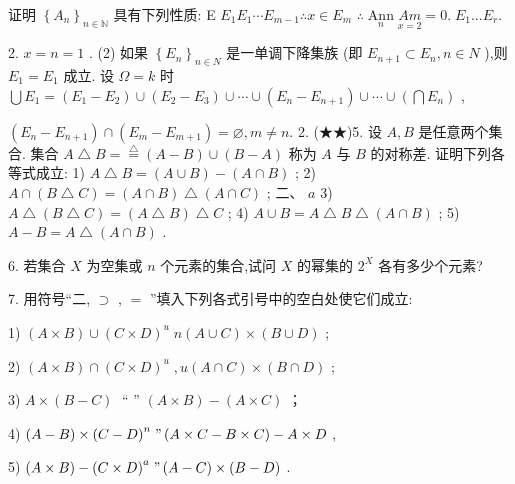 证明 ${\left\{  {A}_{n}\right\}  }_{n \in  \mathbb{N}}$ 具有下列性质: E ${E}_{1}{E}_{1}\cdots {E}_{m - 1}\therefore x \in  {E}_{m}$  $\therefore \mathop{\operatorname{Ann}}\limits_{n}\underset{x = 2}{Am} = 0.\;{E}_{1}...{E}_{r}.$

2. $x = n = 1$ . (2) 如果 ${\left\{  {E}_{n}\right\}  }_{n \in  N}$ 是一单调下降集族 (即 ${E}_{n + 1} \subset  {E}_{n},n \in  N$ ),则 ${E}_{1} = {E}_{1}$ 成立. 设 $\Omega  = k$ 时 $\bigcup {E}_{1} = \left( {{E}_{1} - {E}_{2}}\right)  \cup  \left( {{E}_{2} - {E}_{3}}\right)  \cup  \cdots  \cup  \left( {{E}_{n} - {E}_{n + 1}}\right)  \cup  \cdots  \cup  \left( {\bigcap {E}_{n}}\right)$ ,

$\left( {{E}_{n} - {E}_{n + 1}}\right)  \cap  \left( {{E}_{m} - {E}_{m + 1}}\right)  = \varnothing ,m \neq  n.$ 2. (★★)5. 设 $A,B$ 是任意两个集合. 集合 $A \bigtriangleup  B = \overset{ \bigtriangleup  }{ = }\left( {A - B}\right)  \cup  \left( {B - A}\right)$ 称为 $A$ 与 $B$ 的对称差. 证明下列各等式成立: 1) $A \bigtriangleup  B = \left( {A \cup  B}\right)  - \left( {A \cap  B}\right)$ ; 2) $A \cap  \left( {B\bigtriangleup C}\right)  = \left( {A \cap  B}\right) \bigtriangleup \left( {A \cap  C}\right)$ ; 二、 $a$ 3) $A \bigtriangleup  \left( {B \bigtriangleup  C}\right)  = \left( {A \bigtriangleup  B}\right)  \bigtriangleup  C$ ; 4) $A \cup  B = A \bigtriangleup  B \bigtriangleup  \left( {A \cap  B}\right)$ ; 5) $A - B = A \bigtriangleup  \left( {A \cap  B}\right)$ .

6. 若集合 $X$ 为空集或 $n$ 个元素的集合,试问 $X$ 的幂集的 ${2}^{X}$ 各有多少个元素?

7. 用符号“二, $\supset$ , $=$ ”填入下列各式引号中的空白处使它们成立:

1) $\left( {A \times  B}\right)  \cup  {\left( C \times  D\right) }^{u}\;n\left( {A \cup  C}\right)  \times  \left( {B \cup  D}\right)$ ;

2) $\left( {A \times  B}\right)  \cap  {\left( C \times  D\right) }^{u}\;,u\left( {A \cap  C}\right)  \times  \left( {B \cap  D}\right)$ ;

3) $A \times  \left( {B - C}\right) \;$ “ ” $\left( {A \times  B}\right)  - \left( {A \times  C}\right)$ ；

4) $\left( {A - B}\right)  \times  {\left( C - D\right) }^{n}\;"\left( {A \times  C - B \times  C}\right)  - A \times  D$ ,

5) $\left( {A \times  B}\right)  - {\left( C \times  D\right) }^{a}\;"\left( {A - C}\right)  \times  \left( {B - D}\right)$ .



